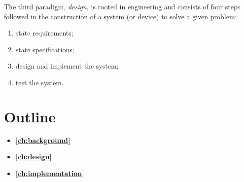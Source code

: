 The third paradigm, \emph{design}, is rooted in engineering and consists of four steps followed in the construction of a system (or device) to solve a given problem:
\begin{enumerate}
    \item state requirements; 
    \item state specifications;
    \item design and implement the system;
    \item test the system.
\end{enumerate}

\section{Outline}\label{sec:outline}
\begin{itemize}
    \item[] \textbf{\autoref{ch:background}}
    \item[] \textbf{\autoref{ch:design}}
    \item[] \textbf{\autoref{ch:implementation}}
\end{itemize}
